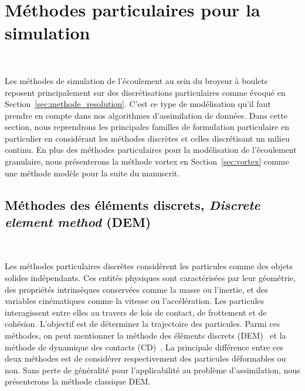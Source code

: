 
\section{Méthodes particulaires pour la simulation}~\label{sec:simu_part}

Les méthodes de simulation de l'écoulement au sein du broyeur à boulets reposent principalement sur des discrétisations particulaires comme évoqué en Section~\ref{sec:methode_resolution}. C'est ce type de modélisation qu'il faut prendre en compte dans nos algorithmes d'assimilation de données. Dans cette section, nous reprendrons les principales familles de formulation particulaire en particulier en considérant les méthodes discrètes et celles discrétisant un milieu continu. En plus des méthodes particulaires pour la modélisation de l'écoulement granulaire, nous présenterons la méthode vortex en Section~\ref{sec:vortex} comme une méthode modèle pour la suite du manuscrit.

\subsection{Méthodes des éléments discrets, \textit{Discrete element method} (DEM)}~\label{sec:part_discret}

Les méthodes particulaires discrètes considèrent les particules comme des objets solides indépendants. Ces entités physiques sont caractérisées par leur géométrie, des propriétés intrinsèques conservées comme la masse ou l'inertie, et des variables cinématiques comme la vitesse ou l'accélération. Les particules interagissent entre elles au travers de lois de contact, de frottement et de cohésion. L'objectif est de déterminer la trajectoire des particules. Parmi ces méthodes, on peut mentionner la méthode des éléments discrets (DEM)~\cite{radjai:hal-00691805} et la méthode de dynamique des contacts (CD)~\cite{moreau:hal-01824750}. La principale différence entre ces deux méthodes est de considérer respectivement des particules déformables ou non. Sans perte de généralité pour l'applicabilité au problème d'assimilation, nous présenterons la méthode classique DEM.

